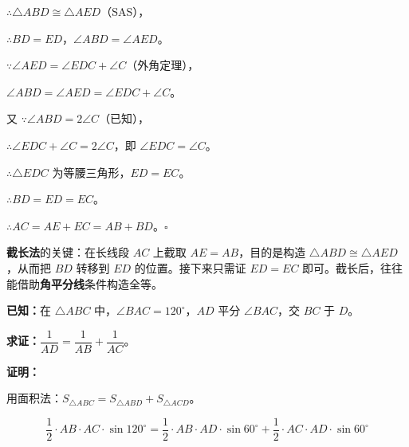 \documentclass[12pt, a4paper]{ctexart}
\begin{document}
\(\therefore \triangle ABD \cong \triangle AED\)（SAS），

\(\therefore BD = ED\)，\(\angle ABD = \angle AED\)。

\(\because \angle AED = \angle EDC + \angle C\)（外角定理），

\(\angle ABD = \angle AED = \angle EDC + \angle C\)。

又 \(\because \angle ABD = 2\angle C\)（已知），

\(\therefore \angle EDC + \angle C = 2\angle C\)，即 \(\angle EDC = \angle C\)。

\(\therefore \triangle EDC\) 为等腰三角形，\(ED = EC\)。

\(\therefore BD = ED = EC\)。

\(\therefore AC = AE + EC = AB + BD\)。\hfill\(\square\)

\begin{tipbox}[思路点拨]
\textbf{截长法}的关键：在长线段 \(AC\) 上截取 \(AE = AB\)，目的是构造 \(\triangle ABD \cong \triangle AED\)，从而把 \(BD\) 转移到 \(ED\) 的位置。接下来只需证 \(ED = EC\) 即可。截长后，往往能借助\textbf{角平分线}条件构造全等。
\end{tipbox}

\begin{examplebox}[【例题 2-2】面积法建立倒数关系]
\textbf{已知：}在 \(\triangle ABC\) 中，\(\angle BAC = 120^\circ\)，\(AD\) 平分 \(\angle BAC\)，交 \(BC\) 于 \(D\)。

\textbf{求证：}\(\dfrac{1}{AD} = \dfrac{1}{AB} + \dfrac{1}{AC}\)。
\end{examplebox}

\noindent\textbf{证明：}

\begin{center}
\end{center}

用面积法：\(S_{\triangle ABC} = S_{\triangle ABD} + S_{\triangle ACD}\)。

\[\frac{1}{2} \cdot AB \cdot AC \cdot \sin 120^\circ = \frac{1}{2} \cdot AB \cdot AD \cdot \sin 60^\circ + \frac{1}{2} \cdot AC \cdot AD \cdot \sin 60^\circ\]
\end{document}

